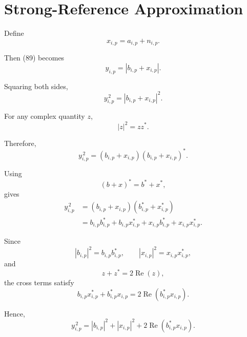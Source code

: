 \documentclass[12pt,a4paper]{article}
\begin{document}
\section{Strong-Reference Approximation}

Define
\begin{equation}
x_{i,p}
=
a_{i,p}+n_{i,p}.
\tag{91}
\end{equation}

Then (89) becomes
\begin{equation}
y_{i,p}
=
|b_{i,p}+x_{i,p}|.
\tag{92}
\end{equation}

Squaring both sides,
\begin{equation}
y_{i,p}^{\,2}
=
|b_{i,p}+x_{i,p}|^2.
\tag{93}
\end{equation}

For any complex quantity $z$,
\begin{equation}
|z|^2=zz^*.
\tag{94}
\end{equation}

Therefore,
\begin{equation}
y_{i,p}^{\,2}
=
(b_{i,p}+x_{i,p})
(b_{i,p}+x_{i,p})^*.
\tag{95}
\end{equation}

Using
\begin{equation}
(b+x)^*=b^*+x^*,
\tag{96}
\end{equation}
gives
\begin{align}
y_{i,p}^{\,2}
&=
(b_{i,p}+x_{i,p})
(b_{i,p}^*+x_{i,p}^*)
\nonumber\\
&=
b_{i,p}b_{i,p}^*
+
b_{i,p}x_{i,p}^*
+
x_{i,p}b_{i,p}^*
+
x_{i,p}x_{i,p}^*.
\tag{97}
\end{align}

Since
\begin{equation}
|b_{i,p}|^2=b_{i,p}b_{i,p}^*,
\qquad
|x_{i,p}|^2=x_{i,p}x_{i,p}^*,
\tag{98}
\end{equation}
and
\begin{equation}
z+z^*=2\operatorname{Re}(z),
\tag{99}
\end{equation}
the cross terms satisfy
\begin{equation}
b_{i,p}x_{i,p}^*
+
b_{i,p}^*x_{i,p}
=
2\operatorname{Re}
\left(
b_{i,p}^*x_{i,p}
\right).
\tag{100}
\end{equation}

Hence,
\begin{equation}
\boxed{
y_{i,p}^{\,2}
=
|b_{i,p}|^2
+
|x_{i,p}|^2
+
2\operatorname{Re}
\left(
b_{i,p}^*x_{i,p}
\right)
}.
\tag{101}
\end{equation}
\end{document}
